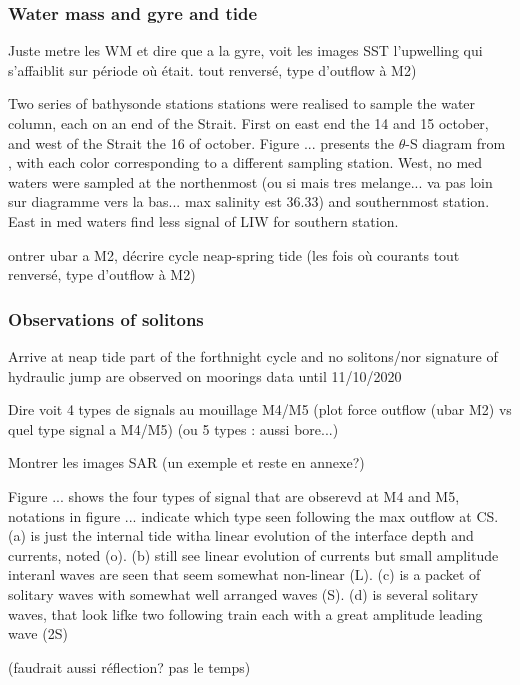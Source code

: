 \subsubsection{Water mass and gyre and tide}

Juste metre les WM et dire que a la gyre, voit les images SST l'upwelling qui s'affaiblit sur période où était.  tout renversé, type d'outflow à M2)

Two series of bathysonde stations stations were realised to sample the water column, each on an end of the Strait. First on east end the 14 and 15 october, and west of the Strait the 16 of october. Figure ... presents the $\theta$-S diagram from , with each color corresponding to a different sampling station.
West, no med waters were sampled at the northenmost (ou si mais tres melange... va pas loin sur diagramme vers la bas... max salinity est 36.33) and southernmost station. East in med waters find less signal of LIW for southern station.


ontrer ubar a M2, décrire cycle neap-spring tide (les fois où courants tout renversé, type d'outflow à M2)

\subsubsection{Observations of solitons}
Arrive at neap tide part of the forthnight cycle and no solitons/nor signature of hydraulic jump are observed on moorings data until 11/10/2020 

Dire voit 4 types de signals au mouillage M4/M5 (plot force outflow (ubar M2) vs quel type signal a M4/M5) (ou 5 types : aussi bore...)

Montrer les images SAR  (un exemple et reste en annexe?)


Figure ... shows the four types of signal that are obserevd at M4 and M5, notations in figure ... indicate which type seen following the max outflow at CS. (a) is just the internal tide witha linear evolution of the interface depth and currents, noted (o). (b) still see linear evolution of currents but small amplitude interanl waves are seen that seem somewhat non-linear (L). (c) is a packet of solitary waves with somewhat well arranged waves (S). (d) is several solitary waves, that look lifke two following train each with a great amplitude leading wave (2S)

(faudrait aussi réflection? pas le temps)


